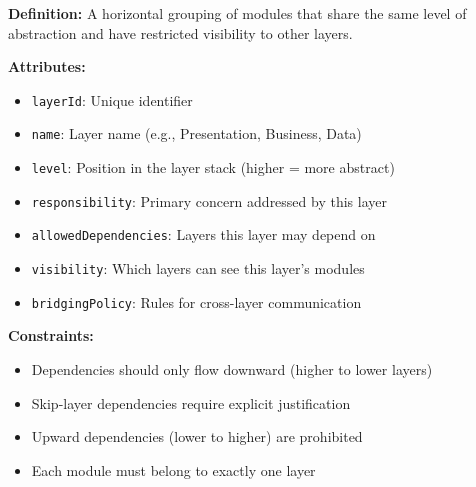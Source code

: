 \documentclass[11pt,letterpaper]{article}
\begin{document}
\begin{definitionbox}
\textbf{Definition:} A horizontal grouping of modules that share the same level of abstraction and have restricted visibility to other layers.

\textbf{Attributes:}
\begin{itemize}[nosep]
    \item \texttt{layerId}: Unique identifier
    \item \texttt{name}: Layer name (e.g., Presentation, Business, Data)
    \item \texttt{level}: Position in the layer stack (higher = more abstract)
    \item \texttt{responsibility}: Primary concern addressed by this layer
    \item \texttt{allowedDependencies}: Layers this layer may depend on
    \item \texttt{visibility}: Which layers can see this layer's modules
    \item \texttt{bridgingPolicy}: Rules for cross-layer communication
\end{itemize}

\textbf{Constraints:}
\begin{itemize}[nosep]
    \item Dependencies should only flow downward (higher to lower layers)
    \item Skip-layer dependencies require explicit justification
    \item Upward dependencies (lower to higher) are prohibited
    \item Each module must belong to exactly one layer
\end{itemize}
\end{definitionbox}
\end{document}
